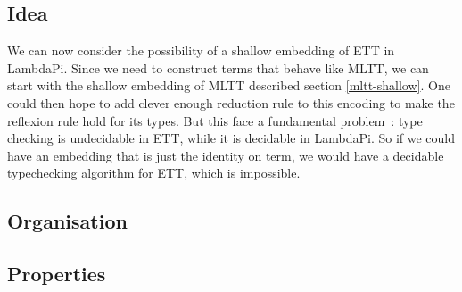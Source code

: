 
\subsection{Idea}

We can now consider the possibility of a shallow embedding of ETT in LambdaPi.
Since we need to construct terms that behave like MLTT, we can start with the
shallow embedding of MLTT described section \ref{mltt-shallow}. One could then
hope to add clever enough reduction rule to this encoding to make the reflexion
rule hold for its types. But this face a fundamental problem~: type checking is
undecidable in ETT, while it is decidable in LambdaPi. So if we could have an
embedding that is just the identity on term, we would have a decidable
typechecking algorithm for ETT, which is impossible.

\subsection{Organisation}

\subsection{Properties}

